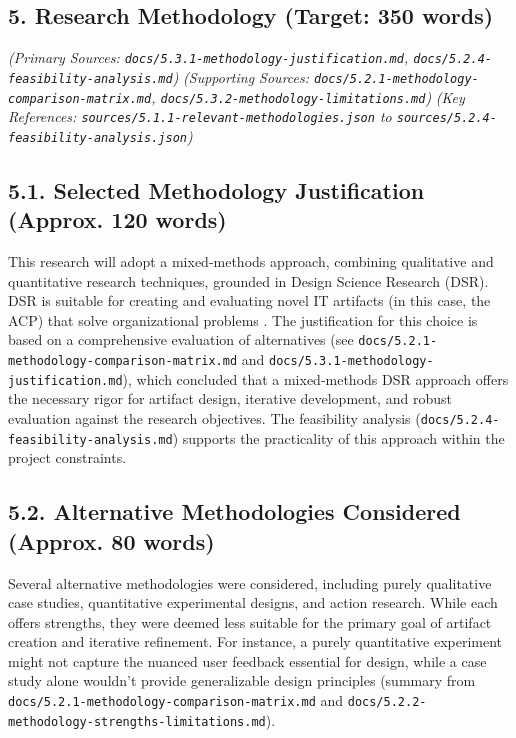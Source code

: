 \documentclass[12pt,a4paper]{article}
\begin{document}
\begin{itemize}
\begin{itemize}
\begin{itemize}
\begin{itemize}
\begin{itemize}
\begin{itemize}
\section{5. Research Methodology (Target: 350 words)}

\emph{(Primary Sources: \texttt{docs/5.3.1-methodology-justification.md}, \texttt{docs/5.2.4-feasibility-analysis.md})}
\emph{(Supporting Sources: \texttt{docs/5.2.1-methodology-comparison-matrix.md}, \texttt{docs/5.3.2-methodology-limitations.md})}
\emph{(Key References: \texttt{sources/5.1.1-relevant-methodologies.json} to \texttt{sources/5.2.4-feasibility-analysis.json})}

\subsection{5.1. Selected Methodology Justification (Approx. 120 words)}
This research will adopt a mixed-methods approach, combining qualitative and quantitative research techniques, grounded in Design Science Research (DSR). DSR is suitable for creating and evaluating novel IT artifacts (in this case, the ACP) that solve organizational problems \cite{CitationNeeded_DSRHevner}. The justification for this choice is based on a comprehensive evaluation of alternatives (see \texttt{docs/5.2.1-methodology-comparison-matrix.md} and \texttt{docs/5.3.1-methodology-justification.md}), which concluded that a mixed-methods DSR approach offers the necessary rigor for artifact design, iterative development, and robust evaluation against the research objectives. The feasibility analysis (\texttt{docs/5.2.4-feasibility-analysis.md}) supports the practicality of this approach within the project constraints.

\subsection{5.2. Alternative Methodologies Considered (Approx. 80 words)}
Several alternative methodologies were considered, including purely qualitative case studies, quantitative experimental designs, and action research. While each offers strengths, they were deemed less suitable for the primary goal of artifact creation and iterative refinement. For instance, a purely quantitative experiment might not capture the nuanced user feedback essential for design, while a case study alone wouldn't provide generalizable design principles (summary from \texttt{docs/5.2.1-methodology-comparison-matrix.md} and \texttt{docs/5.2.2-methodology-strengths-limitations.md}).


\end{itemize}
\end{itemize}
\end{itemize}
\end{itemize}
\end{itemize}
\end{itemize}
\end{document}
